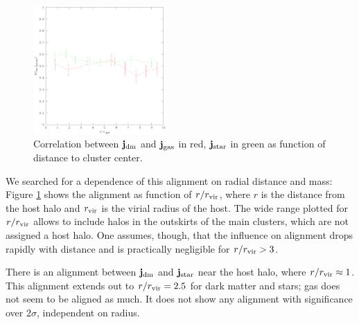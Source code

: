 \documentclass[useAMS,usenatbib]{mn2e}
\begin{document}
%
%
\begin{figure}
  \begin{center}
    \includegraphics[width=0.45\textwidth]{fig/j_dgs_r/out.eps}
  \end{center}

  \caption{ \label{fig:j_dgs_r} Correlation between $\mathbf{j}_{\rm dm}$ and
    $\mathbf{j}_{\rm gas}$ in red, $\mathbf{j}_{\rm star}$ in green as
    function of distance to cluster center.}
\end{figure}
%
%
We searched for a dependence of this alignment on radial distance and mass:
Figure \ref{fig:j_dgs_r} shows the alignment as function of $r/r_{\rm vir}$,
where $r$ is the distance from the host halo and $r_{\rm vir}$ is the virial
radius of the host. The wide range plotted for $r/r_{\rm vir}$ allows to
include halos in the outskirts of the main clusters, which are not assigned a
host halo. One assumes, though, that the influence on alignment drops rapidly
with distance and is practically negligible for $r/r_{\rm vir}>3$.

There is an alignment between $\mathbf{j}_{\rm dm}$ and $\mathbf{j}_{\rm
  star}$ near the host halo, where $r/r_{\rm vir}\approx 1$. This alignment
extends out to $r/r_{\rm vir}=2.5$ for dark matter and stars; gas does not
seem to be aligned as much. It does not show any alignment with significance
over $2\sigma$, independent on radius.
\end{document}
